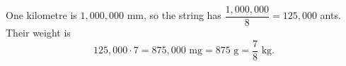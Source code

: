 One kilometre is $1{,}000{,}000$ mm, so the string has $\dfrac{1{,}000{,}000}{8}=125{,}000$ ants. Their weight is
\[
125{,}000\cdot7=875{,}000\text{ mg}=875\text{ g}=\boxed{\dfrac{7}{8}}\text{ kg}.
\]
